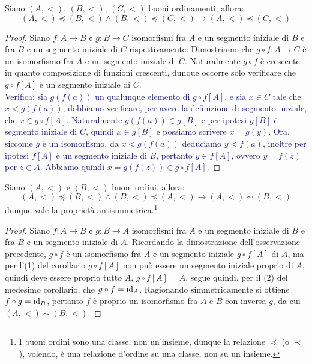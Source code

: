 \begin{remark}
	Siano $(A,<)$, $(B,<)$, $(C,<)$ buoni ordinamenti, allora:
	\[ (A,<) \preceq (B,<) \land (B,<) \preceq (C,<) \rightarrow (A,<) \preceq (C,<)
		\]
\end{remark}

\begin{proof}
	Siano $f : A \rightarrow B$ e $g : B \rightarrow C$ isomorfismi fra $A$ e un segmento iniziale di $B$ e fra $B$ e un segmento iniziale di $C$ rispettivamente.
	Dimostriamo che $g \circ f : A \rightarrow C$ è un isomorfismo fra $A$ e un segmento iniziale di $C$. Naturalmente $g \circ f$ è crescente in quanto composizione di funzioni crescenti, dunque occorre solo verificare che $g \circ f[A]$ è un segmento iniziale di $C$.\\
	\textcolor{MidnightBlue}{Verifica: sia $g(f(a))$ un qualunque elemento di $g \circ f[A]$, e sia $x \in C$ tale che $x < g(f(a))$, dobbiamo verificare, per avere la definizione di segmento iniziale, che $x \in g \circ f[A]$.
	Naturalmente $g(f(a)) \in g[B]$ e per ipotesi $g[B]$ è segmento iniziale di $C$, quindi $x \in g[B]$ e possiamo scrivere $x = g(y)$. Ora, siccome $g$ è un isomorfismo, da $x < g(f(a))$ deduciamo $y < f(a)$, inoltre per ipotesi $f[A]$
	è un segmento iniziale di $B$, pertanto $y \in f[A]$, ovvero $y = f(z)$ per $z \in A$. Abbiamo quindi $x = g(f(z)) \in g \circ f[A]$.}
\end{proof}

\begin{remark}
	Siano $(A,<)$ e $(B,<)$ buoni ordini, allora:
	\[ (A,<) \preceq (B,<) \land (B,<) \preceq (A,<) \rightarrow (A,<) \sim (B,<)
		\]
	dunque vale la proprietà antisimmetrica.\footnote{I buoni ordini sono una classe, non un'insieme, dunque la relazione $\preceq$ (o $\prec$), volendo, è una relazione d'ordine su una classe, non su un insieme.}
\end{remark}

\begin{proof}
	Siano $f : A \rightarrow B$ e $g : B \rightarrow A$ isomorfismi fra $A$ e un segmento iniziale di $B$ e fra $B$ e un segmento iniziale di $A$.
	Ricordando la dimostrazione dell'osservazione precedente, $g \circ f$ è un isomorfismo fra $A$ e un segmento iniziale $g \circ f[A]$ di $A$, ma per l'(1) del corollario 
	$g \circ f[A]$ non può essere un segmento iniziale proprio di $A$, quindi deve essere proprio tutto $A$, $g \circ f[A] = A$.
	segue quindi, per il (2) del medesimo corollario, che $g \circ f = \operatorname{id}_A$. Ragionando simmetricamente si ottiene $f \circ g = \operatorname{id}_B$,
	pertanto $f$ è proprio un isomorfismo fra $A$ e $B$ con inversa $g$, da cui $(A,<) \sim (B,<)$.
\end{proof}

